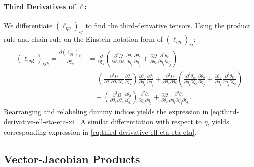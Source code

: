 \documentclass{article}
\begin{document}
\paragraph{Third Derivatives of $\ell$:}

We differentiate $(\ell_{\eta\eta})_{ij}$ to find the third-derivative tensors.
Using the product rule and chain rule on the Einstein notation form of $(\ell_{\eta\eta})_{ij}$:
%
\begin{align}
  (\ell_{\eta\eta\xi})_{ijk} = \frac{\partial (\ell_{\eta\eta})_{ij}}{\partial \xi_k} & = \frac{\partial}{\partial \xi_k} \left( \frac{\partial^2 \Omega}{\partial \theta_a \partial \theta_b} \frac{\partial \theta_a}{\partial \eta_i} \frac{\partial \theta_b}{\partial \eta_j} + \frac{\partial \Omega}{\partial \theta_c} \frac{\partial^2 \theta_c}{\partial \eta_i \partial \eta_j} \right)                                                                                                                                                                                                               \\
                                                                                      & = \left( \frac{\partial^3 \Omega}{\partial \theta_a \partial \theta_b \partial \theta_c} \frac{\partial \theta_c}{\partial \xi_k} \right) \frac{\partial \theta_a}{\partial \eta_i} \frac{\partial \theta_b}{\partial \eta_j} + \frac{\partial^2 \Omega}{\partial \theta_a \partial \theta_b} \left( \frac{\partial^2 \theta_a}{\partial \eta_i \partial \xi_k} \frac{\partial \theta_b}{\partial \eta_j} + \frac{\partial \theta_a}{\partial \eta_i} \frac{\partial^2 \theta_b}{\partial \eta_j \partial \xi_k} \right) \\
                                                                                      & \quad + \left( \frac{\partial^2 \Omega}{\partial \theta_c \partial \theta_d} \frac{\partial \theta_d}{\partial \xi_k} \right) \frac{\partial^2 \theta_c}{\partial \eta_i \partial \eta_j} + \frac{\partial \Omega}{\partial \theta_c} \frac{\partial^3 \theta_c}{\partial \eta_i \partial \eta_j \partial \xi_k}.
\end{align}
%
Rearranging and relabeling dummy indices yields the expression in \cref{eq:third-derivative-ell-eta-eta-xi}.
A similar differentiation with respect to $\eta_l$ yields corresponding expression in \cref{eq:third-derivative-ell-eta-eta-eta}.

\subsection{Vector-Jacobian Products}
\end{document}
